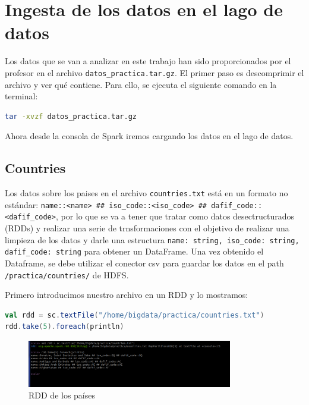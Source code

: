 \chapter{Ingesta de los datos en el lago de datos}

Los datos que se van a analizar en este trabajo han sido proporcionados por el profesor en el archivo \texttt{datos_practica.tar.gz}. El primer paso es descomprimir el archivo y ver qué contiene. Para ello, se ejecuta el siguiente comando en la terminal:

\begin{lstlisting}[language=bash]
tar -xvzf datos_practica.tar.gz
\end{lstlisting}

Ahora desde la consola de Spark iremos cargando los datos en el lago de datos.

\section{Countries}

Los datos sobre los paises en el archivo \texttt{countries.txt} está en un formato no estándar: \texttt{name::<name> \#\# iso_code::<iso_code> \#\# dafif_code::<dafif_code>}, por lo que se va a tener que tratar como datos desectructurados (RDDs) y realizar una serie de trnsformaciones con el objetivo de realizar una limpieza de los datos y darle una estructura \texttt{name: string, iso_code: string,
dafif_code: string} para obtener un DataFrame. Una vez obtenido el Dataframe, se debe utilizar el conector csv para guardar los datos en el path \texttt{/practica/countries/} de HDFS.

Primero introducimos nuestro archivo en un RDD y lo mostramos:

\begin{lstlisting}[language=scala]
val rdd = sc.textFile("/home/bigdata/practica/countries.txt")
rdd.take(5).foreach(println)
\end{lstlisting}

\begin{figure}[H]
    \centering
    \includegraphics[width=0.8\textwidth]{figures/25.png}
    \caption{RDD de los países}
    \label{fig:countries_rdd}
\end{figure}

